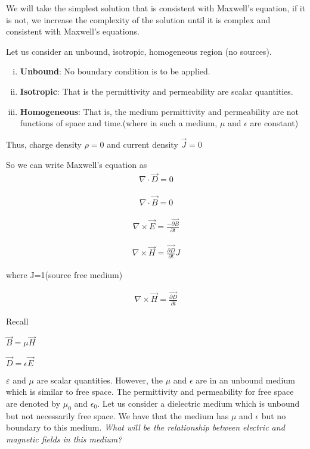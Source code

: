 We will take the simplest solution that is consistent with Maxwell's equation, if it is not, we increase the complexity of the solution until it is complex and consistent with Maxwell's equations.

Let us consider an unbound, isotropic, homogeneous region (no sources).
\begin{enumerate}[(i)]
\item \textbf{Unbound}: No boundary condition is to be applied.
\item \textbf{Isotropic}: That is the permittivity and permeability are scalar quantities.
\item \textbf{Homogeneous}: That is, the medium permittivity and permeability are not functions of space and time.(where  in such a  medium,  $\mu $ and    $\epsilon  $  are    constant) 
\end{enumerate}
Thus, charge density $\rho=0$ and current density $\vec{J}=0$

So we can write Maxwell's equation as
\begin{align}
\nabla\cdot\vec{D}=0
\end{align}

\begin{align}
\nabla\cdot\vec{B}=0
\end{align}

\begin{align}
\nabla\times\vec{E}=\frac{-\vec{\partial B}}{\partial t}
\end{align}

\begin{align}
\nabla\times\vec{H}=\frac{\vec{\partial D}}{\partial t}J
\end{align}

where J=1(source free medium)

\begin{align}
\nabla\times\vec{H}=\frac{\vec{\partial D}}{\partial t}
\end{align}

Recall 

$\vec{B}=\mu\vec{H}$

$\vec{D}=\epsilon\vec{E}$

$\varepsilon$ and $\mu$ are scalar quantities. However, the $\mu$ and $\epsilon$ are in an unbound medium which is similar to free space. The permittivity and permeability for free space are denoted by $\mu_{0}$ and $\epsilon_{0}$. Let us consider a dielectric medium which is unbound but not necessarily free space. We have that the medium has $\mu$ and $\epsilon$ but no boundary to this medium. \emph{What will be the relationship between electric and magnetic fields in this medium?} 



